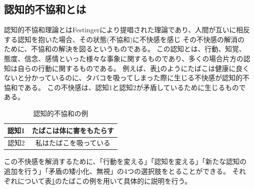 \documentclass{kuisthesis}
\begin{document}

\subsection{認知的不協和とは} %
\label{sec: CDT}
認知的不協和理論\cite{Festinger1957}とはFestingerにより提唱された理論であり、人間が互いに相反する認知を抱いた場合、その状態(不協和)に不快感を感じ
その不快感の解消のために、不協和の解決を図るというものである。
この認知とは、行動、知覚、態度、信念、感情といった様々な事象に関するものであり、多くの場合片方の認知は自らの行動に関するものである。
例えば、表\ref{fig: CDTExample}のようにたばこは健康に良くないと分かっているのに、タバコを吸ってしまった際に生じる不快感が認知的不協和である。
この不快感は、認知1と認知2が矛盾しているために生じるものである。
\begin{table}[H]
  \centering\caption{認知的不協和の例}
  \label{fig: CDTExample}

  \begin{tabular}{c|c}
      認知1 & たばこは体に害をもたらす  \\ \hline
      認知2 & 私はたばこを吸っている \\ 
  \end{tabular}
  
\end{table}
この不快感を解消するために、「行動を変える」「認知を変える」「新たな認知の追加を行う」「矛盾の矮小化、無視」の4つの選択肢をとることができる。
それぞれについて表\ref{fig: CDTExample}のたばこの例を用いて具体的に説明を行う。
\end{document}
